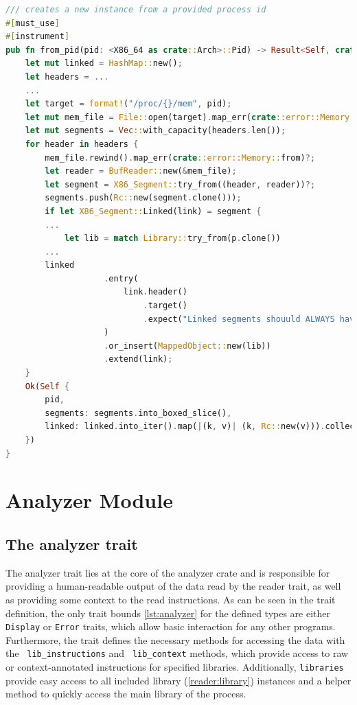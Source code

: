 \begin{lstlisting}[caption=\label{lst:map_from_pid}"Excerpt from x86\_64 Map's from\_pid function", language=Rust, breaklines=true]
/// creates a new instance from a provided process id
#[must_use]
#[instrument]
pub fn from_pid(pid: <X86_64 as crate::Arch>::Pid) -> Result<Self, crate::error::Error> {
    let mut linked = HashMap::new();
    let headers = ...
    ...
    let target = format!("/proc/{}/mem", pid);
    let mut mem_file = File::open(target).map_err(crate::error::Memory::from)?;
    let mut segments = Vec::with_capacity(headers.len());
    for header in headers {
        mem_file.rewind().map_err(crate::error::Memory::from)?;
        let reader = BufReader::new(&mem_file);
        let segment = X86_Segment::try_from((header, reader))?;
        segments.push(Rc::new(segment.clone()));
        if let X86_Segment::Linked(link) = segment {
        ...
            let lib = match Library::try_from(p.clone())
        ...
        linked
                    .entry(
                        link.header()
                            .target()
                            .expect("Linked segments shouuld ALWAYS have a valid target"),
                    )
                    .or_insert(MappedObject::new(lib))
                    .extend(link);
    }
    Ok(Self {
        pid,
        segments: segments.into_boxed_slice(),
        linked: linked.into_iter().map(|(k, v)| (k, Rc::new(v))).collect(),
    })
}
\end{lstlisting}

\section{Analyzer Module}
\label{analyzer}

\subsection{The analyzer trait}
\label{analyzer:trait}

The analyzer trait lies at the core of the analyzer crate and is responsible for providing a human-readable output of the data read by the reader trait, as well as providing some context to the read instructions. 
As can be seen in the trait definition, the only trait bounds \autoref{lst:analyzer} for the defined types are either \verb|Display| or \verb|Error| traits, which allow basic interaction for any other programs.
Furthermore, the trait defines the necessary methods for accessing the data with the \verb| lib_instructions| and \verb| lib_context| methods, which provide access to raw or context-annotated instructions for specified libraries. 
Additionally, \verb|libraries| provide easy access to all included library (\autoref{reader:library}) instances and a helper method to quickly access the main library of the process.

